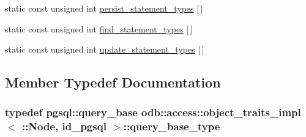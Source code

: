 \begin{DoxyCompactItemize}
\item 
static const unsigned int \hyperlink{classodb_1_1access_1_1object__traits__impl_3_01_1_1_node_00_01id__pgsql_01_4_ad9c3f290f8f2010ac9bad77b8f1a1d3e}{persist\+\_\+statement\+\_\+types} \mbox{[}$\,$\mbox{]}
\item 
static const unsigned int \hyperlink{classodb_1_1access_1_1object__traits__impl_3_01_1_1_node_00_01id__pgsql_01_4_a7183d7c395234302a467bd76ef4bcb47}{find\+\_\+statement\+\_\+types} \mbox{[}$\,$\mbox{]}
\item 
static const unsigned int \hyperlink{classodb_1_1access_1_1object__traits__impl_3_01_1_1_node_00_01id__pgsql_01_4_a1a69f196cc6959424bf4a7c95c84df61}{update\+\_\+statement\+\_\+types} \mbox{[}$\,$\mbox{]}
\end{DoxyCompactItemize}


\subsection{Member Typedef Documentation}
\hypertarget{classodb_1_1access_1_1object__traits__impl_3_01_1_1_node_00_01id__pgsql_01_4_ae2db30bff69cc56f29d45406604fcf9b}{}
\subsubsection[{query\+\_\+base\+\_\+type}]{\setlength{\rightskip}{0pt plus 5cm}typedef pgsql\+::query\+\_\+base odb\+::access\+::object\+\_\+traits\+\_\+impl$<$ \+::{\bf Node}, id\+\_\+pgsql $>$\+::{\bf query\+\_\+base\+\_\+type}}\label{classodb_1_1access_1_1object__traits__impl_3_01_1_1_node_00_01id__pgsql_01_4_ae2db30bff69cc56f29d45406604fcf9b}
\hypertarget{classodb_1_1access_1_1object__traits__impl_3_01_1_1_node_00_01id__pgsql_01_4_ac387d48078d92bd85fcfd24b710fd7e6}{}
